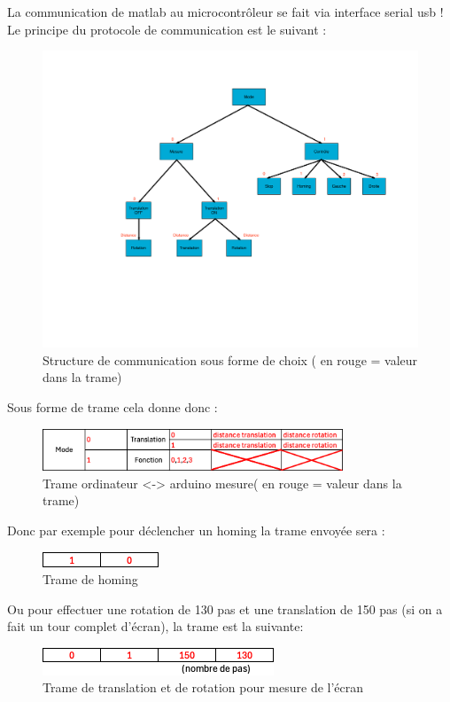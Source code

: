 La communication de matlab au microcontrôleur se fait via interface serial usb !
Le principe du protocole de communication est le suivant :
\begin{figure}[H]
    \centering
    \includegraphics[page = 1, width = \textwidth, trim = {7cm 9cm 2cm 3cm},clip]{assets/figures/ameliorations/trame_comm.pdf}
    \caption[Structure de communication]{Structure de communication sous forme de choix ( en \color{red} rouge \color{black} = valeur dans la trame)}
\end{figure}
Sous forme de trame cela donne donc :
\begin{figure}[H]
    \centering
    \includegraphics[width = 0.8\textwidth]{assets/figures/ameliorations/trame comm.png}
    \caption[Trame ordinateur <-> arduino mesure]{Trame ordinateur <-> arduino mesure( en \color{red} rouge \color{black} = valeur dans la trame)}
\end{figure}

Donc par exemple pour déclencher un homing la trame envoyée sera :
\begin{figure}[H]
    \centering
    \includegraphics[scale = 1.3]{assets/figures/ameliorations/trame_homing.png}
    \caption[Trame homing]{Trame de homing}
\end{figure}
Ou pour effectuer une rotation de 130 pas et une translation de 150 pas (si on a fait un tour complet d'écran), la trame est la suivante:
\begin{figure}[H]
    \centering
    \includegraphics[scale = 1.2]{assets/figures/ameliorations/trame_translation_rotation.png}
    \caption[Trame translation rotation]{Trame de translation et de rotation pour mesure de l'écran\label{fig:trame_trans_rota}}
\end{figure}

